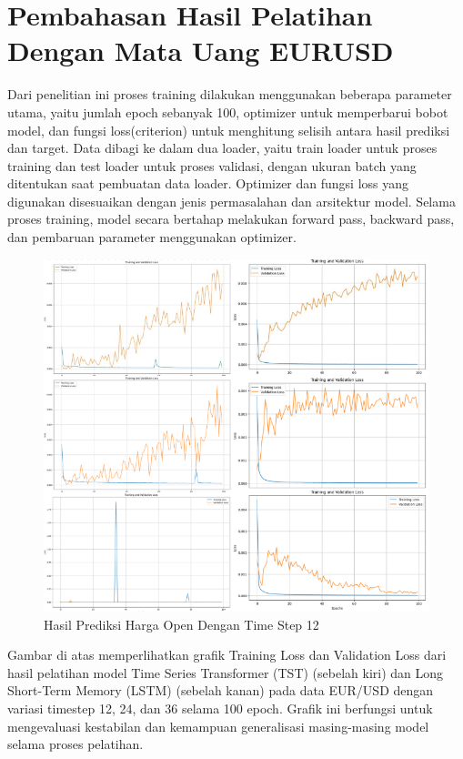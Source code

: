 \section{Pembahasan Hasil Pelatihan Dengan Mata Uang EURUSD}
Dari penelitian ini proses training dilakukan menggunakan beberapa parameter utama, yaitu jumlah epoch sebanyak 100, optimizer untuk memperbarui bobot model, dan fungsi loss(criterion) untuk menghitung selisih antara hasil prediksi dan target. Data dibagi ke dalam dua loader, yaitu train loader untuk proses training dan test loader untuk proses validasi, dengan
ukuran batch yang ditentukan saat pembuatan data loader. Optimizer dan fungsi loss yang digunakan disesuaikan dengan jenis permasalahan dan arsitektur model. Selama proses training, model secara bertahap melakukan forward pass, backward pass, dan pembaruan parameter menggunakan optimizer.
\begin{figure} [H] \centering
    \includegraphics[scale=1.2]{gambar/perbandingan training_EURUSD.png} 
    \caption{Hasil Prediksi Harga Open Dengan Time Step 12}
    \label{fig:label_gambar}
\end{figure}
Gambar di atas memperlihatkan grafik Training Loss dan Validation Loss dari hasil pelatihan model Time Series Transformer (TST) (sebelah kiri) dan Long Short-Term Memory (LSTM) (sebelah kanan) pada data EUR/USD dengan variasi timestep 12, 24, dan 36 selama 100 epoch. Grafik ini berfungsi untuk mengevaluasi kestabilan dan kemampuan generalisasi masing-masing model selama proses pelatihan.

